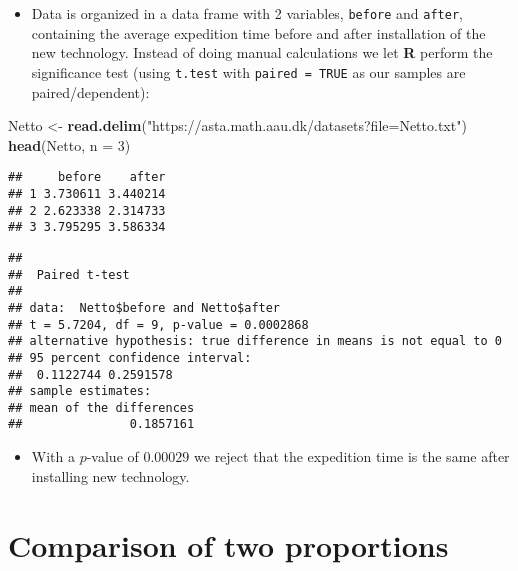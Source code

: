 \documentclass[]{article}
\newenvironment{Shaded}{\begin{snugshade}}{\end{snugshade}}
\newcommand{\KeywordTok}[1]{\textcolor[rgb]{0.13,0.29,0.53}{\textbf{#1}}}
\newcommand{\DataTypeTok}[1]{\textcolor[rgb]{0.13,0.29,0.53}{#1}}
\newcommand{\DecValTok}[1]{\textcolor[rgb]{0.00,0.00,0.81}{#1}}
\newcommand{\StringTok}[1]{\textcolor[rgb]{0.31,0.60,0.02}{#1}}
\newcommand{\OtherTok}[1]{\textcolor[rgb]{0.56,0.35,0.01}{#1}}
\newcommand{\OperatorTok}[1]{\textcolor[rgb]{0.81,0.36,0.00}{\textbf{#1}}}
\newcommand{\NormalTok}[1]{#1}
\providecommand{\tightlist}{%
  \setlength{\itemsep}{0pt}\setlength{\parskip}{0pt}}
\begin{document}
\begin{itemize}
\tightlist
\item
  Data is organized in a data frame with 2 variables, \texttt{before}
  and \texttt{after}, containing the average expedition time before and
  after installation of the new technology. Instead of doing manual
  calculations we let \textbf{R} perform the significance test (using
  \texttt{t.test} with \texttt{paired\ =\ TRUE} as our samples are
  paired/dependent):
\end{itemize}

\begin{Shaded}
\begin{Highlighting}[]
\NormalTok{Netto <-}\StringTok{ }\KeywordTok{read.delim}\NormalTok{(}\StringTok{"https://asta.math.aau.dk/datasets?file=Netto.txt"}\NormalTok{)}
\KeywordTok{head}\NormalTok{(Netto, }\DataTypeTok{n =} \DecValTok{3}\NormalTok{)}
\end{Highlighting}
\end{Shaded}

\begin{verbatim}
##     before    after
## 1 3.730611 3.440214
## 2 2.623338 2.314733
## 3 3.795295 3.586334
\end{verbatim}

\begin{Shaded}
\end{Shaded}

\begin{verbatim}
## 
##  Paired t-test
## 
## data:  Netto$before and Netto$after
## t = 5.7204, df = 9, p-value = 0.0002868
## alternative hypothesis: true difference in means is not equal to 0
## 95 percent confidence interval:
##  0.1122744 0.2591578
## sample estimates:
## mean of the differences 
##               0.1857161
\end{verbatim}

\begin{itemize}
\tightlist
\item
  With a \(p\)-value of \(0.00029\) we reject that the expedition time
  is the same after installing new technology.
\end{itemize}

\section{Comparison of two
proportions}\label{comparison-of-two-proportions}
\end{document}
